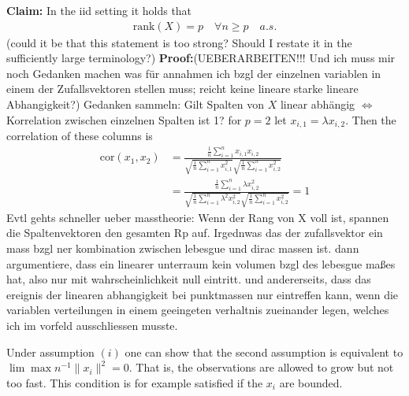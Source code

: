 \documentclass[Research_Module_ES.tex]{subfiles}
\begin{document}
\textbf{Claim:} In the iid setting it holds that
\begin{align*}
\mathrm{rank}(X) = p \quad \forall n\ge p \quad a.s.
\end{align*}
(could it be that this statement is too strong? Should I restate it in the sufficiently large terminology?)
\textbf{Proof:}(UEBERARBEITEN!!! Und ich muss mir noch Gedanken machen was für annahmen ich bzgl der einzelnen variablen in einem der Zufallsvektoren stellen muss; reicht keine lineare starke lineare Abhangigkeit?) 
Gedanken sammeln: Gilt 
Spalten von $X$ linear abhängig $\iff$ Korrelation zwischen einzelnen Spalten ist 1?
for $p=2$ let $x_{i,1}=\lambda x_{i,2}$. Then the correlation of these columns is 
\begin{align*}
\mathrm{cor}(x_1,x_2) &= \frac{\frac{1}{n}\sum_{i=1}^n x_{i,1}x_{i,2}}
{\sqrt{\frac{1}{n}\sum_{i=1}^n x_{i,1}^2}\sqrt{\frac{1}{n}\sum_{i=1}^n x_{i,2}^2}}\\
&= \frac{\frac{1}{n}\sum_{i=1}^n \lambda x_{i,2}^2}
{\sqrt{\frac{1}{n}\sum_{i=1}^n \lambda^2 x_{i,2}^2}\sqrt{\frac{1}{n}\sum_{i=1}^n x_{i,2}^2}} = 1
\end{align*}
Evtl gehts schneller ueber masstheorie: Wenn der Rang von X voll ist, spannen die Spaltenvektoren den gesamten Rp auf. Irgednwas das der zufallsvektor ein mass bzgl ner kombination zwischen lebesgue und dirac massen ist.
dann argumentiere, dass ein linearer unterraum kein volumen bzgl des lebesgue maßes hat, also nur mit wahrscheinlichkeit null eintritt. und andererseits, dass das ereignis der linearen abhangigkeit bei punktmassen nur eintreffen kann, wenn die variablen verteilungen in einem geeingeten verhaltnis zueinander legen, welches ich im vorfeld ausschliessen musste.


Under assumption $(i)$ one can show that the second assumption is equivalent to $\lim \max n^{-1}\lVert x_i\rVert^2=0$. That is, the observations are allowed to grow but not too fast. This condition is for example satisfied if the $x_i$ are bounded.
\end{document}

